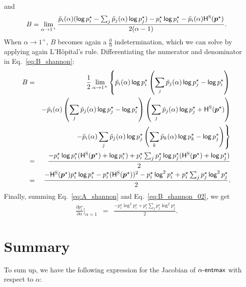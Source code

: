 and
\begin{equation}\label{eq:B_shannon}
    B = \lim_{\alpha \rightarrow 1^+} \frac{\tilde{p}_i(\alpha) (\operatorname*{\mathsf{log}} p_i^{\star} - \sum_j \tilde{p}_j(\alpha) \operatorname*{\mathsf{log}} p_j^{\star}) - p_i^{\star}\operatorname*{\mathsf{log}} p_i^{\star} - \tilde{p}_i(\alpha) \mathsf{H}^{\textsc{S}}(\bm{p}^{\star})}{2(\alpha-1)}.
\end{equation}
When $\alpha\rightarrow 1^+$, $B$ becomes again a $\frac{0}{0}$ indetermination, which we can solve by applying again L'H\^opital's rule. Differentiating the numerator and denominator in Eq.~\ref{eq:B_shannon}:
\begin{eqnarray}\label{eq:B_shannon_02}
    B &=& \frac{1}{2}\lim_{\alpha \rightarrow 1^+} \left\{ \tilde{p}_i(\alpha) \operatorname*{\mathsf{log}} p_i^{\star} \left(\sum_j \tilde{p}_j(\alpha) \operatorname*{\mathsf{log}} p_j^{\star} - \operatorname*{\mathsf{log}} p_i^{\star}\right) \right. \nonumber\\
    && - \tilde{p}_i(\alpha) \left(\sum_j \tilde{p}_j(\alpha) \operatorname*{\mathsf{log}} p_j^{\star} - \operatorname*{\mathsf{log}} p_i^{\star}\right) \left(\sum_j \tilde{p}_j(\alpha) \operatorname*{\mathsf{log}} p_j^{\star} + \mathsf{H}^{\textsc{S}}(\bm{p}^{\star})\right) \nonumber\\
    && \left. - \tilde{p}_i(\alpha) \sum_j \tilde{p}_j(\alpha) \operatorname*{\mathsf{log}} p_j^{\star} \left(\sum_k \tilde{p}_k(\alpha) \operatorname*{\mathsf{log}} p_k^{\star} - \operatorname*{\mathsf{log}} p_j^{\star}\right)\right\}\nonumber\\
    &=& \frac{-p_i^{\star} \operatorname*{\mathsf{log}} p_i^{\star}(\mathsf{H}^{\textsc{S}}(\bm{p}^{\star}) + \operatorname*{\mathsf{log}} p_i^{\star})
    +p_i^{\star} \sum_j p_j^{\star} \operatorname*{\mathsf{log}} p_j^{\star}(\mathsf{H}^{\textsc{S}}(\bm{p}^{\star}) + \operatorname*{\mathsf{log}} p_j^{\star})}{2}\nonumber\\
    &=& \frac{-\mathsf{H}^{\textsc{S}}(\bm{p}^{\star}) p_i^{\star}\operatorname*{\mathsf{log}} p_i^{\star} - p_i^{\star} (\mathsf{H}^{\textsc{S}}(\bm{p}^{\star}))^2 - p_i^{\star}\operatorname*{\mathsf{log}}^2 p_i^{\star} + p_i^{\star} \sum_j p_j^{\star}\operatorname*{\mathsf{log}}^2 p_j^{\star}}{2}.
\end{eqnarray}
Finally, summing Eq.~\ref{eq:A_shannon} and Eq.~\ref{eq:B_shannon_02}, we get
\begin{eqnarray}\label{eq:gradient_alpha_shannon_02}
    \frac{\partial p_i^{\star}}{\partial \alpha}\bigg|_{\alpha=1} &=& \frac{- p_i^{\star}\log^2 p_i^{\star} + p_i^{\star} \sum_j p_j^{\star}\log^2 p_j^{\star}}{2}.
\end{eqnarray}

\section*{Summary}

To sum up, we have the following expression for the Jacobian of $\mathop{\mathsf{\alpha}\textnormal{-}\mathsf{entmax}}$ with respect to $\alpha$:

